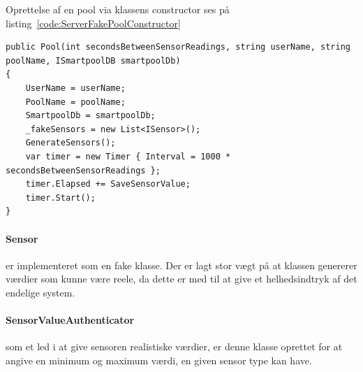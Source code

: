 Oprettelse af en pool via klassens constructor ses på listing~\ref{code:ServerFakePoolConstructor}
\begin{lstlisting}[caption=Server.FakePool.Constructor,label=code:ServerFakePoolConstructor]
public Pool(int secondsBetweenSensorReadings, string userName, string poolName, ISmartpoolDB smartpoolDb)
{
	UserName = userName;
	PoolName = poolName;
	SmartpoolDb = smartpoolDb;
	_fakeSensors = new List<ISensor>();
	GenerateSensors();
	var timer = new Timer { Interval = 1000 * secondsBetweenSensorReadings };
	timer.Elapsed += SaveSensorValue;
	timer.Start();
}
\end{lstlisting}

\paragraph{Sensor} er implementeret som en fake klasse. Der er lagt stor vægt på at klassen genererer værdier som kunne være reele, da dette er med til at give et helhedsindtryk af det endelige system. 

\paragraph{SensorValueAuthenticator} som et led i at give sensoren realistiske værdier, er denne klasse oprettet for at angive en minimum og maximum værdi, en given sensor type kan have.